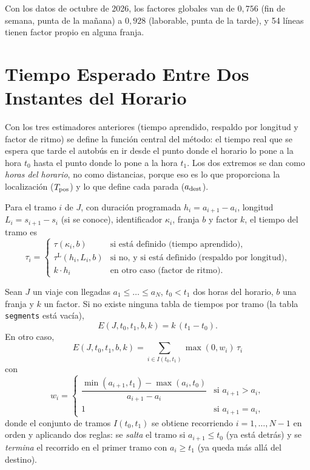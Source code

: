 Con los datos de octubre de 2026, los factores globales van de $0{,}756$ (fin de semana, punta de la mañana) a $0{,}928$
(laborable, punta de la tarde), y 54 líneas tienen factor propio en alguna franja.

\section{Tiempo Esperado Entre Dos Instantes del Horario}
\label{sec:tiempo-esperado}

Con los tres estimadores anteriores (tiempo aprendido, respaldo por longitud y factor de ritmo) se define la función
central del método: el tiempo real que se espera que tarde el autobús en ir desde el punto donde el horario lo pone a
la hora $t_0$ hasta el punto donde lo pone a la hora $t_1$. Los dos extremos se dan como \emph{horas del horario}, no
como distancias, porque eso es lo que proporciona la localización ($T_{\mathrm{pos}}$) y lo que define cada parada ($a_{\mathrm{dest}}$).

\begin{definicion}
Para el tramo $i$ de $J$, con duración programada $h_i=a_{i+1}-a_i$, longitud $L_i=s_{i+1}-s_i$ (si se conoce),
identificador $\kappa_i$, franja $b$ y factor $k$, el tiempo del tramo es
\begin{equation}
\label{eq:cascada}
\tau_i=\begin{cases}
\tau(\kappa_i,b) & \text{si está definido (tiempo aprendido)},\\
\tau^{\mathrm{L}}(h_i,L_i,b) & \text{si no, y si está definido (respaldo por longitud)},\\
k\cdot h_i & \text{en otro caso (factor de ritmo).}
\end{cases}
\end{equation}
\end{definicion}

\begin{definicion}
\label{def:tiempo-esperado}
Sean $J$ un viaje con llegadas $a_1\le\dots\le a_N$, $t_0<t_1$ dos horas del horario, $b$ una franja y $k$ un
factor. Si no existe ninguna tabla de tiempos por tramo (la tabla \texttt{segments} está vacía),
\[
E(J,t_0,t_1,b,k)=k\,(t_1-t_0).
\]
En otro caso,
\begin{equation}
\label{eq:tiempo-esperado}
\boxed{\;E(J,t_0,t_1,b,k)=\sum_{i\in I(t_0,t_1)}\max(0,w_i)\,\tau_i\;}
\end{equation}
con
\begin{equation}
\label{eq:pesos}
w_i=\begin{cases}\dfrac{\min(a_{i+1},t_1)-\max(a_i,t_0)}{a_{i+1}-a_i} & \text{si } a_{i+1}>a_i,\\[2mm] 1 & \text{si } a_{i+1}=a_i,\end{cases}
\end{equation}
donde el conjunto de tramos $I(t_0,t_1)$ se obtiene recorriendo $i=1,\dots,N-1$ en orden y aplicando dos reglas:
se \emph{salta} el tramo si $a_{i+1}\le t_0$ (ya está detrás) y se \emph{termina} el recorrido en el primer tramo con
$a_i\ge t_1$ (ya queda más allá del destino).
\end{definicion}

